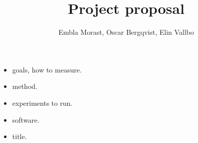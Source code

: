 \documentclass{article}
\title{Project proposal}
\author{Embla Morast, Oscar Bergqvist, Elin Vallbo }
\begin{document}
\begin{itemize}
\item goals, how to measure.
\item method.
\item experiments to run.
\item software.
\item title.
 
\end{itemize}
\end{document}
